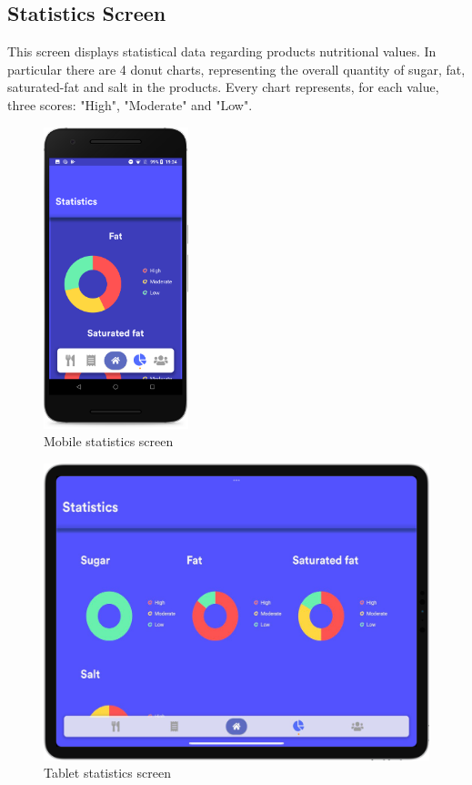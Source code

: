 \subsection{Statistics Screen}
This screen displays statistical data regarding products nutritional values.
In particular there are 4 donut charts, representing the overall quantity of sugar, fat, saturated-fat and salt in the products.
Every chart represents, for each value, three scores: "High", "Moderate" and "Low".\newpage

\begin{figure}[H]
  \centering
    \vspace*{-0.3cm}
     \includegraphics[width=42mm,scale=0.9]{./Images//Mobile_mocks/statistics1.png}
     \vspace*{-0.3cm}
     \caption{Mobile statistics screen}
\end{figure}

\vspace*{-0.3cm}
\begin{figure}[H]
  \centering
    \includegraphics[scale=0.22]{./Images//Tablet_mocks/statistics1.png}
    \vspace*{-0.3cm}
    \caption{Tablet statistics screen}
\end{figure}